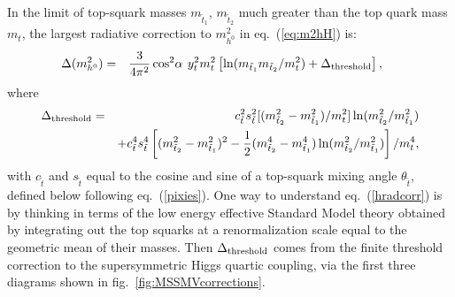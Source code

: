 \documentclass[11pt]{article}
\def\beq{\begin{eqnarray}}
\def\eeq{\end{eqnarray}}
\def\stilde{\widetilde}
\def\half{{1\over 2}}
\begin{document}
In the limit of top-squark
masses $m_{\stilde t_1}$, $m_{\stilde t_2}$ much greater than the top 
quark mass $m_t$, the largest radiative correction 
to $m_{h^0}^2$ in eq.~(\ref{eq:m2hH}) is:
\beq
\Delta (m^2_{h^0}) &=&
{3\over 4 \pi^2} \cos^2\!\alpha\>\, y_t^2 m_t^2
\left [
{\rm ln}(m_{\tilde t_1} m_{\tilde t_2} / m_t^2  )
+ \Delta_{\rm threshold} \right ], \phantom{xx}
\label{hradcorr}
\eeq
where 
\beq
\Delta_{\rm threshold} &=& 
c_{\tilde t}^2 s_{\tilde t}^2 [(m_{\tilde t_2}^2 - m_{\tilde t_1}^2)/m_t^2]
\, {\rm ln}(m_{\tilde t_2}^2/m_{\tilde t_1}^2) 
\nonumber
\\ 
&&
+ c_{\tilde t}^4 s_{\tilde t}^4 \left [
(m_{\tilde t_2}^2 - m_{\tilde t_1}^2)^2 - \half
(m_{\tilde t_2}^4 - m_{\tilde t_1}^4)
\, {\rm ln}(m_{\tilde t_2}^2/m_{\tilde t_1}^2) 
\right ]/m_t^4,
\label{eq:detDeltathreshold}
\eeq
with $c_{\tilde t}$ and $s_{\tilde t}$ equal to the cosine and sine of a top-squark mixing angle $\theta_{\tilde t}$, defined below following eq.~(\ref{pixies}).
One way to understand eq.~(\ref{hradcorr}) is by thinking in terms of the 
low energy effective Standard Model theory obtained by integrating out the top
squarks at a renormalization scale equal to the geometric mean of their masses.
Then 
$\Delta_{\rm threshold}$
comes from the finite threshold correction to the supersymmetric 
Higgs quartic coupling, via the first three
diagrams shown in fig.~\ref{fig:MSSMVcorrections}. 
\end{document}
